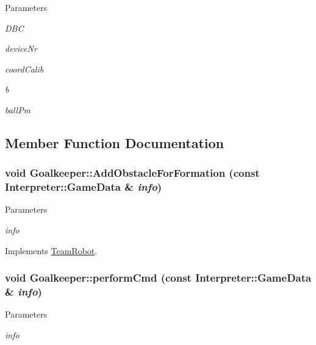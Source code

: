 \begin{DoxyParams}{Parameters}
\item[{\em DBC}]\item[{\em deviceNr}]\item[{\em coordCalib}]\item[{\em b}]\item[{\em ballPm}]\end{DoxyParams}


\subsection{Member Function Documentation}
\hypertarget{classGoalkeeper_a5287a2e74795bbec8f0ead767655da5d}{
\subsubsection[{AddObstacleForFormation}]{\setlength{\rightskip}{0pt plus 5cm}void Goalkeeper::AddObstacleForFormation (const {\bf Interpreter::GameData} \& {\em info})}}
\label{classGoalkeeper_a5287a2e74795bbec8f0ead767655da5d}

\begin{DoxyParams}{Parameters}
\item[{\em info}]\end{DoxyParams}


Implements \hyperlink{classTeamRobot_a71ec65db46db1ac511fe17b668d4f192}{TeamRobot}.

\hypertarget{classGoalkeeper_ab850d0d2278730bebc5479f1a339a925}{
\subsubsection[{performCmd}]{\setlength{\rightskip}{0pt plus 5cm}void Goalkeeper::performCmd (const {\bf Interpreter::GameData} \& {\em info})}}
\label{classGoalkeeper_ab850d0d2278730bebc5479f1a339a925}

\begin{DoxyParams}{Parameters}
\item[{\em info}]\end{DoxyParams}



